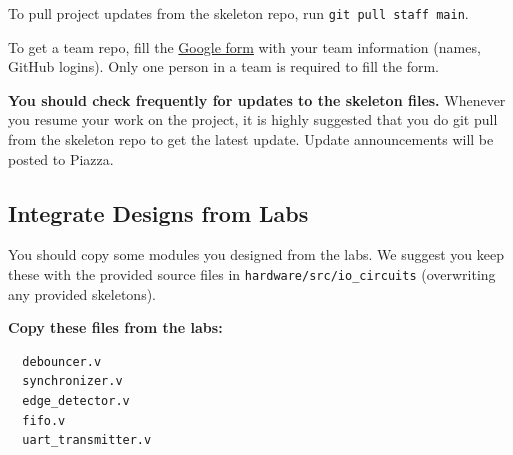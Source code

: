 \documentclass[11pt]{article}
\begin{document}
To pull project updates from the skeleton repo, run \verb|git pull staff main|.

To get a team repo, fill the \href{https://docs.google.com/spreadsheets/d/1me8UbxdPkuWcUw25fGh9d9KCvhcWxplXCiFuPWfstoY/edit#gid=0}{Google form} with your team information (names, GitHub logins). Only one person in a team is required to fill the form.

\textbf{You should check frequently for updates to the skeleton files.} Whenever you resume your work on the project,
it is highly suggested that you do git pull from the skeleton repo to get the latest update.
Update announcements will be posted to Piazza.

\subsection{Integrate Designs from Labs} \label{sec:past_designs}
You should copy some modules you designed from the labs.
We suggest you keep these with the provided source files in \verb|hardware/src/io_circuits| (overwriting any provided skeletons).

\textbf{Copy these files from the labs:}
\begin{verbatim}
  debouncer.v
  synchronizer.v
  edge_detector.v
  fifo.v
  uart_transmitter.v
\end{verbatim}
\end{document}
